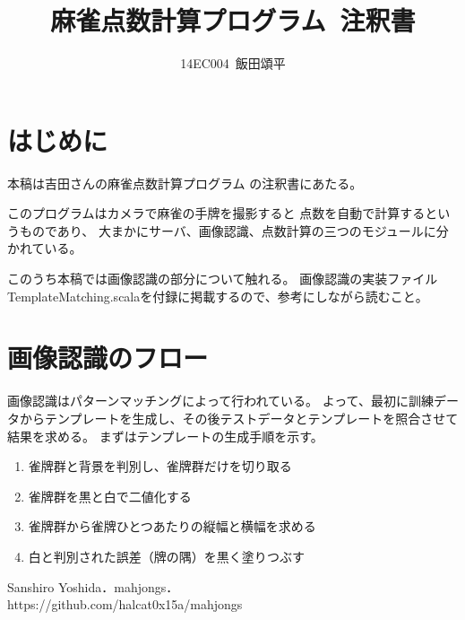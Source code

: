 \documentclass{jsarticle}
\title{麻雀点数計算プログラム\ 注釈書}
\author{14EC004\ 飯田頌平}
\begin{document}
\maketitle

\begin{multicols}{2}

\section{はじめに}
本稿は吉田さんの麻雀点数計算プログラム\cite{yoshida}
の注釈書にあたる。

このプログラムはカメラで麻雀の手牌を撮影すると
点数を自動で計算するというものであり、
大まかにサーバ、画像認識、点数計算の三つのモジュールに分かれている。

このうち本稿では画像認識の部分について触れる。
画像認識の実装ファイルTemplateMatching.scalaを付録に掲載するので、参考にしながら読むこと。

\section{画像認識のフロー}

画像認識はパターンマッチングによって行われている。
よって、最初に訓練データからテンプレートを生成し、その後テストデータとテンプレートを照合させて結果を求める。
まずはテンプレートの生成手順を示す。
\begin{enumerate}
\item 雀牌群と背景を判別し、雀牌群だけを切り取る
\item 雀牌群を黒と白で二値化する
\item 雀牌群から雀牌ひとつあたりの縦幅と横幅を求める
\item 白と判別された誤差（牌の隅）を黒く塗りつぶす
\end{enumerate}

%

\begin{thebibliography}{9}
	Sanshiro Yoshida．mahjongs．\\
	https://github.com/halcat0x15a/mahjongs
\end{thebibliography}

\end{multicols}
\end{document}
